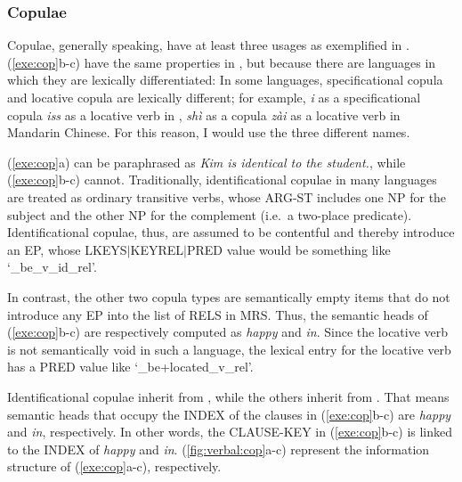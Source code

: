 \subsubsection{Copulae}
\label{10:sssec:cop}

Copulae, generally speaking, have at least three usages as exemplified
in . (\ref{exe:cop}b-c) have the same
properties in , but because there are languages in which they
are lexically differentiated: 
In some languages, specificational copula and locative copula are lexically
  different; for example, \textit{i} as a specificational copula \vs
  \textit{iss} as a locative verb in , \textit{sh\`{i}} as
  a copula \vs \textit{z\`{a}i} as a locative verb in Mandarin
  Chinese. For this reason, I would use the three different names.



\noindent (\ref{exe:cop}a) can be paraphrased as \textit{Kim is
  identical to the student.}, while (\ref{exe:cop}b-c)
cannot. Traditionally, identificational copulae in many languages are
treated as ordinary transitive verbs, whose ARG-ST includes one NP for
the subject and the other NP for the complement (i.e.\ a two-place
predicate).  Identificational copulae, thus, are assumed to be
contentful and thereby introduce an EP, whose
LKEYS{$\mid$}KEYREL{$\mid$}PRED value would be something like
`\_be\_v\_id\_rel'.


In contrast, the other two copula types are semantically empty items
that do not introduce any EP into the list of RELS in MRS.
Thus, the semantic heads of (\ref{exe:cop}b-c) are respectively
computed as \textit{happy} and \textit{in}. 
Since the locative verb is not semantically void in such a
language, the lexical entry for the locative verb has a PRED value
like `\_be+located\_v\_rel'.



Identificational copulae inherit from ,
while the others inherit from . That means
semantic heads that occupy the INDEX of the clauses in
(\ref{exe:cop}b-c) are \textit{happy} and \textit{in},
respectively. In other words, the CLAUSE-KEY in
(\ref{exe:cop}b-c) is linked to the INDEX of \textit{happy} and
\textit{in}. (\ref{fig:verbal:cop}a-c) represent the information
structure of (\ref{exe:cop}a-c), respectively.

